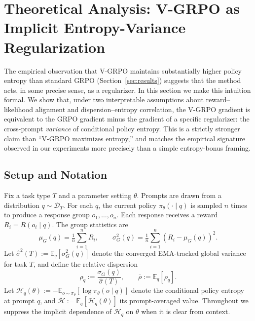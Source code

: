\documentclass[10pt]{article}
\begin{document}
\section{Theoretical Analysis: V-GRPO as Implicit Entropy-Variance Regularization}
\label{sec:theory}

The empirical observation that V-GRPO maintains substantially higher policy
entropy than standard GRPO (Section~\ref{sec:results}) suggests that the method
acts, in some precise sense, as a regularizer. In this section we make this
intuition formal. We show that, under two interpretable assumptions about
reward--likelihood alignment and dispersion--entropy correlation, the V-GRPO
gradient is equivalent to the GRPO gradient minus the gradient of a specific
regularizer: the cross-prompt \emph{variance} of conditional policy entropy.
This is a strictly stronger claim than ``V-GRPO maximizes entropy,'' and
matches the empirical signature observed in our experiments more precisely
than a simple entropy-bonus framing.

\subsection{Setup and Notation}
\label{sec:theory:setup}

Fix a task type $T$ and a parameter setting $\theta$. Prompts are drawn from a
distribution $q \sim \mathcal{D}_T$. For each $q$, the current policy
$\pi_\theta(\cdot \mid q)$ is sampled $n$ times to produce a response group
$o_1, \dots, o_n$. Each response receives a reward $R_i = R(o_i \mid q)$. The
group statistics are
\begin{equation}
\mu_G(q) = \tfrac{1}{n}\sum_{i=1}^n R_i,
\qquad
\sigma_G^2(q) = \tfrac{1}{n}\sum_{i=1}^n (R_i - \mu_G(q))^2.
\end{equation}
Let $\hat\sigma^2(T) := \mathbb{E}_q[\sigma_G^2(q)]$ denote the converged
EMA-tracked global variance for task $T$, and define the relative dispersion
\begin{equation}
\rho_q := \frac{\sigma_G(q)}{\hat\sigma(T)},
\qquad \bar\rho := \mathbb{E}_q[\rho_q].
\end{equation}
Let $\mathcal{H}_q(\theta) := -\mathbb{E}_{o\sim\pi_\theta}[\log\pi_\theta(o\mid q)]$
denote the conditional policy entropy at prompt $q$, and
$\bar{\mathcal{H}} := \mathbb{E}_q[\mathcal{H}_q(\theta)]$ its prompt-averaged
value. Throughout we suppress the implicit dependence of $\mathcal{H}_q$ on
$\theta$ when it is clear from context.
\end{document}
